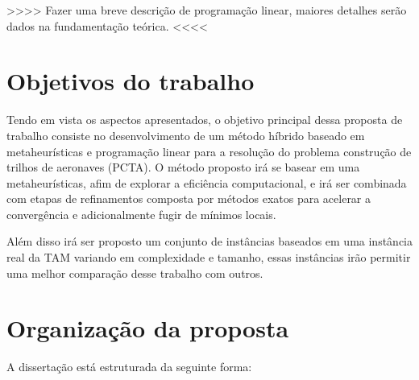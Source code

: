 {\large	>>>> Fazer uma breve descrição de programação linear, maiores detalhes serão dados na fundamentação teórica. <<<<	}

\section {Objetivos do trabalho}

Tendo em vista os aspectos apresentados, o objetivo principal dessa proposta de trabalho consiste no desenvolvimento de um método híbrido baseado em metaheurísticas e programação linear para a resolução do problema construção de trilhos de aeronaves (PCTA). O método proposto irá se basear em uma metaheurísticas, afim de explorar a eficiência computacional, e irá ser combinada com etapas de refinamentos composta por métodos exatos para acelerar a convergência e adicionalmente fugir de mínimos locais.

Além disso irá ser proposto um conjunto de instâncias baseados em uma instância real da TAM variando em complexidade e tamanho, essas instâncias irão permitir uma melhor comparação desse trabalho com outros.

\section {Organização da proposta }

A dissertação está estruturada da seguinte forma:


